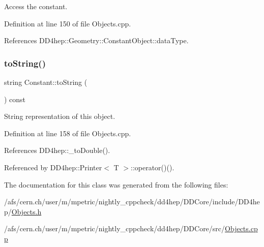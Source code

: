 Access the constant. 



Definition at line 150 of file Objects.\+cpp.



References D\+D4hep\+::\+Geometry\+::\+Constant\+Object\+::data\+Type.

\hypertarget{class_d_d4hep_1_1_geometry_1_1_constant_a7eae0003864db52da7b9476d68c93aad}{}\label{class_d_d4hep_1_1_geometry_1_1_constant_a7eae0003864db52da7b9476d68c93aad} 
\subsubsection{\texorpdfstring{to\+String()}{toString()}}
{\footnotesize\ttfamily string Constant\+::to\+String (\begin{DoxyParamCaption}{ }\end{DoxyParamCaption}) const}



String representation of this object. 



Definition at line 158 of file Objects.\+cpp.



References D\+D4hep\+::\+\_\+to\+Double().



Referenced by D\+D4hep\+::\+Printer$<$ T $>$\+::operator()().



The documentation for this class was generated from the following files\+:\begin{DoxyCompactItemize}
\item 
/afs/cern.\+ch/user/m/mpetric/nightly\+\_\+cppcheck/dd4hep/\+D\+D\+Core/include/\+D\+D4hep/\hyperlink{_objects_8h}{Objects.\+h}\item 
/afs/cern.\+ch/user/m/mpetric/nightly\+\_\+cppcheck/dd4hep/\+D\+D\+Core/src/\hyperlink{_objects_8cpp}{Objects.\+cpp}\end{DoxyCompactItemize}
